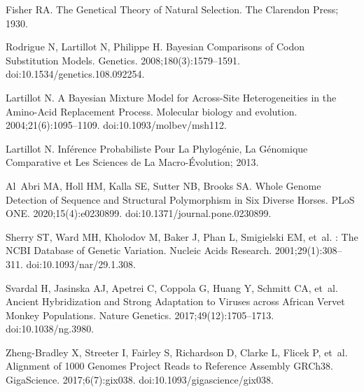 \documentclass{article}
\begin{document}
\begin{thebibliography}{10}
        Fisher RA.
        \newblock The {{Genetical Theory}} of {{Natural Selection}}.
        \newblock The Clarendon Press; 1930.

        Rodrigue N, Lartillot N, Philippe H.
        \newblock Bayesian Comparisons of Codon Substitution Models.
        \newblock Genetics. 2008;180(3):1579--1591.
        \newblock doi:{10.1534/genetics.108.092254}.

        Lartillot N.
        \newblock A Bayesian Mixture Model for Across-Site Heterogeneities in the
        Amino-Acid Replacement Process.
        \newblock Molecular biology and evolution. 2004;21(6):1095--1109.
        \newblock doi:{10.1093/molbev/msh112}.

        Lartillot N.
        \newblock Inf{\'e}rence Probabiliste Pour La Phylog{\'e}nie, La G{\'e}nomique
        Comparative et Les Sciences de La Macro-{\'E}volution; 2013.

        Al~Abri MA, Holl HM, Kalla SE, Sutter NB, Brooks SA.
        \newblock Whole Genome Detection of Sequence and Structural Polymorphism in Six
        Diverse Horses.
        \newblock PLoS ONE. 2020;15(4):e0230899.
        \newblock doi:{10.1371/journal.pone.0230899}.

        Sherry ST, Ward MH, Kholodov M, Baker J, Phan L, Smigielski EM, et~al.
        : The {{NCBI}} Database of Genetic Variation.
        \newblock Nucleic Acids Research. 2001;29(1):308--311.
        \newblock doi:{10.1093/nar/29.1.308}.

        Svardal H, Jasinska AJ, Apetrei C, Coppola G, Huang Y, Schmitt CA, et~al.
        \newblock Ancient Hybridization and Strong Adaptation to Viruses across
            {{African}} Vervet Monkey Populations.
        \newblock Nature Genetics. 2017;49(12):1705--1713.
        \newblock doi:{10.1038/ng.3980}.

        {Zheng-Bradley} X, Streeter I, Fairley S, Richardson D, Clarke L, Flicek P,
        et~al.
        \newblock Alignment of 1000 {{Genomes Project}} Reads to Reference Assembly
            {{GRCh38}}.
        \newblock GigaScience. 2017;6(7):gix038.
        \newblock doi:{10.1093/gigascience/gix038}.


\end{thebibliography}
\end{document}
